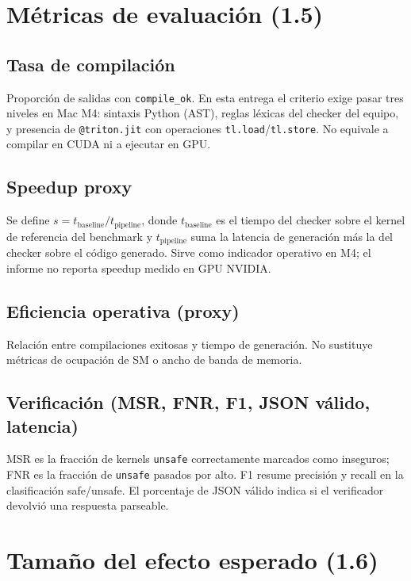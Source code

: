 \section{Métricas de evaluación (1.5)}

\subsection{Tasa de compilación}

Proporción de salidas con \texttt{compile\_ok}. En esta entrega el criterio exige pasar tres niveles en Mac M4: sintaxis Python (AST), reglas léxicas del checker del equipo, y presencia de \texttt{@triton.jit} con operaciones \texttt{tl.load}/\texttt{tl.store}. No equivale a compilar en CUDA ni a ejecutar en GPU.

\subsection{Speedup proxy}

Se define $s = t_{\mathrm{baseline}} / t_{\mathrm{pipeline}}$, donde $t_{\mathrm{baseline}}$ es el tiempo del checker sobre el kernel de referencia del benchmark y $t_{\mathrm{pipeline}}$ suma la latencia de generación más la del checker sobre el código generado. Sirve como indicador operativo en M4; el informe no reporta speedup medido en GPU NVIDIA.

\subsection{Eficiencia operativa (proxy)}

Relación entre compilaciones exitosas y tiempo de generación. No sustituye métricas de ocupación de SM o ancho de banda de memoria.

\subsection{Verificación (MSR, FNR, F1, JSON válido, latencia)}

MSR es la fracción de kernels \texttt{unsafe} correctamente marcados como inseguros; FNR es la fracción de \texttt{unsafe} pasados por alto. F1 resume precisión y recall en la clasificación safe/unsafe. El porcentaje de JSON válido indica si el verificador devolvió una respuesta parseable.

\section{Tamaño del efecto esperado (1.6)}

